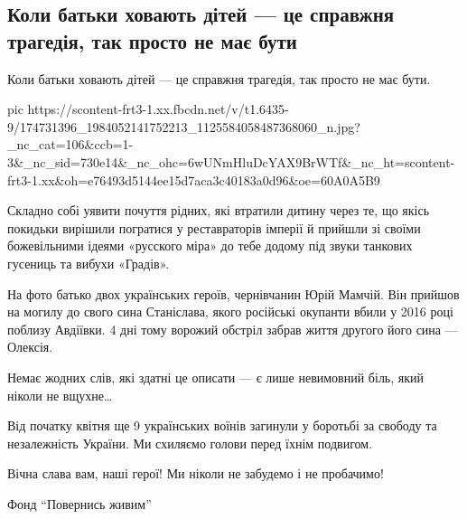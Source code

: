  
 
 
 
 

\subsection{Коли батьки ховають дітей — це справжня трагедія, так просто не має бути}

Коли батьки ховають дітей — це справжня трагедія, так просто не має бути. 

\ifcmt
  pic https://scontent-frt3-1.xx.fbcdn.net/v/t1.6435-9/174731396_1984052141752213_1125584058487368060_n.jpg?_nc_cat=106&ccb=1-3&_nc_sid=730e14&_nc_ohc=6wUNmHluDcYAX9BrWTf&_nc_ht=scontent-frt3-1.xx&oh=e76493d5144ee15d7aca3c40183a0d96&oe=60A0A5B9
\fi

Складно собі уявити почуття рідних, які втратили дитину через те, що якісь
покидьки вирішили погратися у реставраторів імперії й прийшли зі своїми
божевільними ідеями «русского міра» до тебе додому під звуки танкових гусениць
та вибухи «Градів». 

На фото батько двох українських героїв, чернівчанин Юрій Мамчій. Він прийшов на
могилу до свого сина Станіслава, якого російські окупанти вбили у 2016 році
поблизу Авдіївки. 4 дні тому ворожий обстріл забрав життя другого його сина —
Олексія. 

Немає жодних слів, які здатні це описати — є лише невимовний біль, який ніколи не вщухне…

Від початку квітня ще 9 українських воїнів загинули у боротьбі за свободу та
незалежність України. Ми схиляємо голови перед їхнім подвигом. 

Вічна слава вам, наші герої! Ми ніколи не забудемо і не пробачимо!

Фонд \enquote{Повернись живим}
